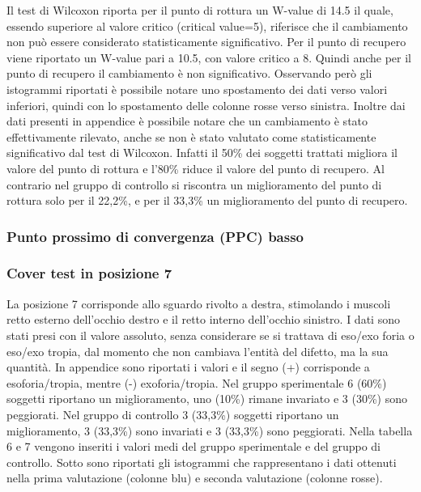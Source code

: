 Il test di Wilcoxon riporta per il punto di rottura un W-value di 14.5 il quale, essendo superiore al valore critico (critical value=5), riferisce che il cambiamento non può essere considerato statisticamente significativo. Per il punto di recupero viene riportato un W-value pari a 10.5, con valore critico a 8. Quindi anche per il punto di recupero il cambiamento è non significativo. Osservando però gli istogrammi riportati è possibile notare uno spostamento dei dati verso valori inferiori, quindi con lo spostamento delle colonne rosse verso sinistra. Inoltre dai dati presenti in appendice è possibile notare che un cambiamento è stato effettivamente rilevato, anche se non è stato valutato come statisticamente significativo dal test di Wilcoxon. Infatti il 50\% dei soggetti trattati migliora il valore del punto di rottura e l’80\% riduce il valore del punto di recupero. Al contrario nel gruppo di controllo si riscontra un miglioramento del punto di rottura solo per il 22,2\%, e per il 33,3\% un miglioramento del punto di recupero.

\subsubsection{Punto prossimo di convergenza (PPC) basso}




\subsubsection{Cover test in posizione 7}

La posizione 7 corrisponde allo sguardo rivolto a destra, stimolando i muscoli retto esterno dell’occhio destro e il retto interno dell’occhio sinistro. I dati sono stati presi con il valore assoluto, senza considerare se si trattava di eso/exo foria o eso/exo tropia, dal momento che non cambiava l’entità del difetto, ma la sua quantità. In appendice sono riportati i valori e il segno (+) corrisponde a esoforia/tropia, mentre (-) exoforia/tropia. Nel gruppo sperimentale 6 (60\%) soggetti riportano un miglioramento, uno (10\%) rimane invariato e 3 (30\%) sono peggiorati. Nel gruppo di controllo 3 (33,3\%) soggetti riportano un miglioramento, 3 (33,3\%) sono invariati e 3 (33,3\%) sono peggiorati. Nella tabella 6 e 7 vengono inseriti i valori medi del gruppo sperimentale e del gruppo di controllo. Sotto sono riportati gli istogrammi che rappresentano i dati ottenuti nella prima valutazione (colonne blu) e seconda valutazione (colonne rosse).

